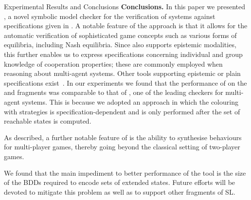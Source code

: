 \begin{section}{Experimental Results and Conclusions}
\textbf{Conclusions.}
In this paper we presented \MCMASSLK, a novel symbolic model checker for the
verification of systems against specifications given in \SLK.
A notable feature of the approach is that it allows for the automatic
verification of sophisticated game concepts such as various forms of equilibria,
including Nash equilibria.
Since \MCMASSLK also supports epistemic modalities, this further enables us to
express specifications concerning individual and group knowledge of cooperation
properties; these are commonly employed when reasoning about multi-agent
systems.
Other tools supporting epistemic or plain \ATL specifications
exist~\cite{AHMQRT98,GM04,KNNPPSWZ07,LQR09}.
In our experiments we found that the performance of \MCMASSLK on the \ATL and
\CTLK fragments was comparable to that of \MCMAS, one of the leading checkers
for multi-agent systems.
This is because we adopted an approach in which the colouring with strategies is
specification-dependent and is only performed after the set of reachable states
is computed.

As described, a further notable feature of \MCMASSLK is the ability to
synthesise behaviours for multi-player games, thereby going beyond the
classical setting of two-player games.

We found that the main impediment to better performance of the tool is
the size of the BDDs required to encode sets of extended
states. Future efforts will be devoted to mitigate this problem as
well as to support other fragments of SL.



\end{section}
















